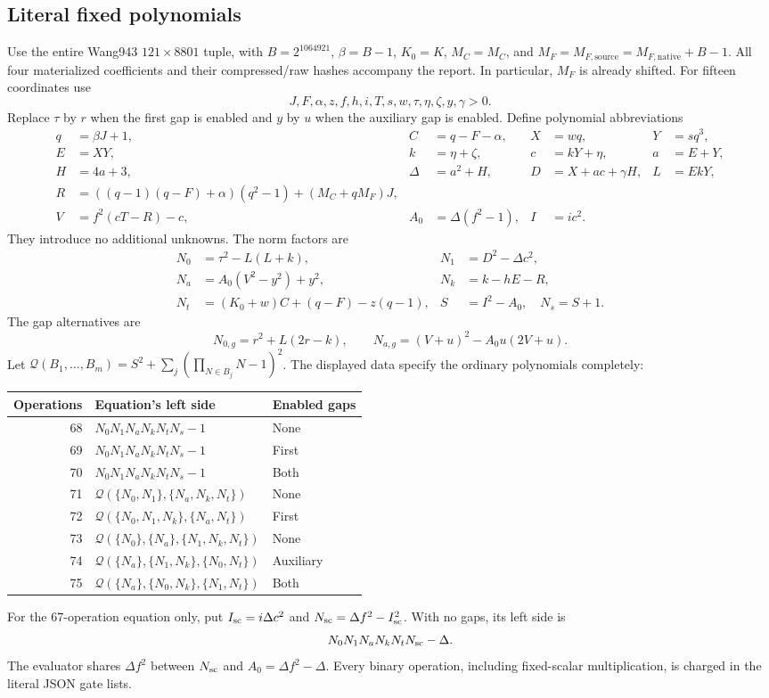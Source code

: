 \subsection{Literal fixed polynomials}
Use the entire Wang943 $121\times8801$ tuple, with
$B=2^{1064921}$, $\beta=B-1$, $K_0=K$, $M_C=M_C$, and
$M_F=M_{F,\mathrm{source}}=M_{F,\mathrm{native}}+B-1$.
All four materialized coefficients and their compressed/raw hashes accompany
the report. In particular, $M_F$ is already shifted.
For fifteen coordinates use
\[
 J,F,\alpha,z,f,h,i,T,s,w,\tau,\eta,\zeta,y,\gamma>0.
\]
Replace $\tau$ by $r$ when the first gap is enabled and $y$ by $u$
when the auxiliary gap is enabled. Define polynomial abbreviations
{\small
\begin{align*}
 q&=\beta J+1,& C&=q-F-\alpha,&X&=wq,&Y&=sq^3,\\
 E&=XY,& k&=\eta+\zeta,&c&=kY+\eta,&a&=E+Y,\\
 H&=4a+3,&\Delta&=a^2+H,&D&=X+ac+\gamma H,&L&=EkY,\\
 R&=((q-1)(q-F)+\alpha)(q^2-1)+(M_C+qM_F)J,\\
 V&=f^2(cT-R)-c,& A_0&=\Delta(f^2-1),&I&=ic^2.
\end{align*}
}
They introduce no additional unknowns. The norm factors are
\begin{align*}
 N_0&=\tau^2-L(L+k),&N_1&=D^2-\Delta c^2,\\
 N_a&=A_0(V^2-y^2)+y^2,&N_k&=k-hE-R,\\
 N_t&=(K_0+w)C+(q-F)-z(q-1),&S&=I^2-A_0,\quad N_s=S+1.
\end{align*}
The gap alternatives are
\[
 N_{0,g}=r^2+L(2r-k),\qquad
 N_{a,g}=(V+u)^2-A_0u(2V+u).
\]
Let $\mathcal Q(B_1,\ldots,B_m)=S^2+
\sum_j(\prod_{N\in B_j}N-1)^2$. The displayed data specify the ordinary
polynomials completely:
\begin{center}\small
\begin{tabular}{rll}
\toprule
Operations & Equation's left side & Enabled gaps\\\midrule
68&$N_0N_1N_aN_kN_tN_s-1$&None\\
69&$N_0N_1N_aN_kN_tN_s-1$&First\\
70&$N_0N_1N_aN_kN_tN_s-1$&Both\\
71&$\mathcal Q(\{N_0,N_1\},\{N_a,N_k,N_t\})$&None\\
72&$\mathcal Q(\{N_0,N_1,N_k\},\{N_a,N_t\})$&First\\
73&$\mathcal Q(\{N_0\},\{N_a\},\{N_1,N_k,N_t\})$&None\\
74&$\mathcal Q(\{N_a\},\{N_1,N_k\},\{N_0,N_t\})$&Auxiliary\\
75&$\mathcal Q(\{N_a\},\{N_0,N_k\},\{N_1,N_t\})$&Both\\\bottomrule
\end{tabular}\end{center}
For the 67-operation equation only, put $I_{\rm sc}=i\Delta c^2$ and
$N_{\rm sc}=\Delta f^2-I_{\rm sc}^2$. With no gaps, its left side is
\[
 N_0N_1N_aN_kN_tN_{\rm sc}-\Delta.
\]
The evaluator shares $\Delta f^2$ between $N_{\rm sc}$ and
$A_0=\Delta f^2-\Delta$. Every binary operation, including fixed-scalar
multiplication, is charged in the literal JSON gate lists.

